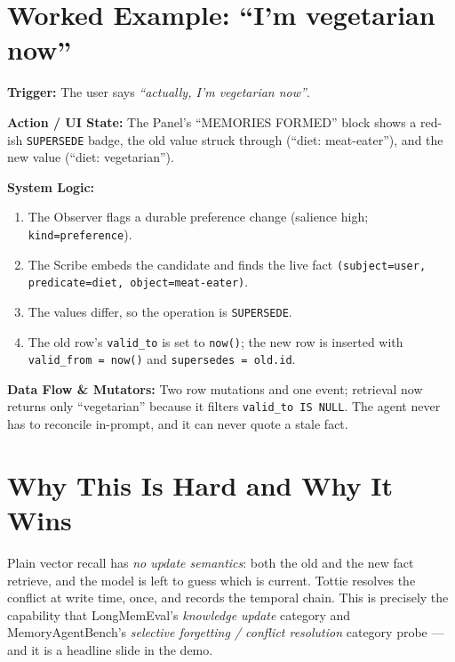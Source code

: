 \section{Worked Example: ``I'm vegetarian now''}
\textbf{Trigger:} The user says \emph{``actually, I'm vegetarian now''}.

\textbf{Action / UI State:} The Panel's ``MEMORIES FORMED'' block shows a red-ish
\texttt{SUPERSEDE} badge, the old value struck through (``diet: meat-eater''), and the new value
(``diet: vegetarian'').

\textbf{System Logic:}
\begin{enumerate}
  \item The Observer flags a durable preference change (salience high; \texttt{kind=preference}).
  \item The Scribe embeds the candidate and finds the live fact \texttt{(subject=user,
  predicate=diet, object=meat-eater)}.
  \item The values differ, so the operation is \texttt{SUPERSEDE}.
  \item The old row's \texttt{valid\_to} is set to \texttt{now()}; the new row is inserted with
  \texttt{valid\_from = now()} and \texttt{supersedes = old.id}.
\end{enumerate}

\textbf{Data Flow \& Mutators:} Two row mutations and one event; retrieval now returns only
``vegetarian'' because it filters \texttt{valid\_to IS NULL}. The agent never has to reconcile
in-prompt, and it can never quote a stale fact.

\section{Why This Is Hard and Why It Wins}
Plain vector recall has \emph{no update semantics}: both the old and the new fact retrieve, and the
model is left to guess which is current. Tottie resolves the conflict at write time, once, and
records the temporal chain. This is precisely the capability that LongMemEval's \emph{knowledge
update} category and MemoryAgentBench's \emph{selective forgetting / conflict resolution} category
probe --- and it is a headline slide in the demo.
